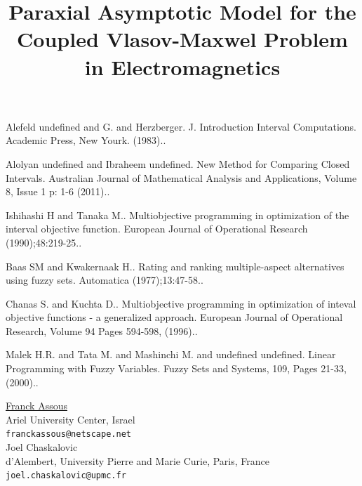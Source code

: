 \documentclass[article, A4, 11pt]{llncs}%
\begin{document}

\begin{thebibliography}{10}
{\sc Alefeld undefined and G. and Herzberger}. {J. Introduction Interval Computations}.   Academic Press, New Yourk. (1983)..

{\sc Alolyan undefined and Ibraheem undefined}. {New Method for Comparing Closed Intervals}. Australian Journal of Mathematical Analysis and Applications, Volume 8, Issue 1 p: 1-6 (2011)..

{\sc Ishihashi H and Tanaka M.}. {Multiobjective programming in optimization of the interval objective function}. European Journal of Operational Research (1990);48:219-25..

{\sc Baas SM and Kwakernaak H.}. {Rating and ranking multiple-aspect alternatives using fuzzy sets}. Automatica (1977);13:47-58..

{\sc Chanas S. and Kuchta D.}. {Multiobjective programming in optimization of inteval objective functions - a generalized approach}. European Journal of Operational Research, Volume 94 Pages 594-598, (1996)..

{\sc Malek H.R. and Tata M. and Mashinchi M. and undefined undefined}. {Linear Programming with Fuzzy Variables}. Fuzzy Sets and Systems, 109, Pages 21-33, (2000)..
\end{thebibliography} %

\title{Paraxial Asymptotic Model for the Coupled Vlasov-Maxwel Problem in Electromagnetics}
 \author{} \institute{}
\maketitle
\begin{center}
{\large \underline{Franck Assous}}\\
Ariel University Center, Israel\\
{\tt franckassous@netscape.net}
\\ \vspace{4mm}
{\large Joel Chaskalovic}\\
d'Alembert,  University Pierre and Marie Curie, Paris, France\\
{\tt joel.chaskalovic@upmc.fr}
\end{center}
\end{document}
